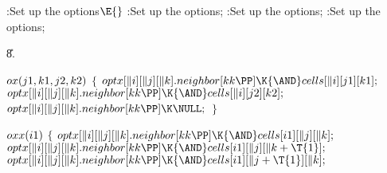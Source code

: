 \B{}:Set up the options\X${}\E{}$\6
:Set up the  options\X;\6
:Set up the  options\X;\6
:Set up the  options\X;\par
\U8.\fi

\B\D$\\{ox}(\\{j1},\\{k1},\\{j2},\\{k2})$ \6
${}\{{}$\1\6
${}\\{optx}[\|i][\|j][\|k].\\{neighbor}[\\{kk}\PP]\K{\AND}\\{cells}[\|i][%
\\{j1}][\\{k1}];{}$\6
${}\\{optx}[\|i][\|j][\|k].\\{neighbor}[\\{kk}\PP]\K{\AND}\\{cells}[\|i][%
\\{j2}][\\{k2}];{}$\6
${}\\{optx}[\|i][\|j][\|k].\\{neighbor}[\\{kk}\PP]\K\NULL;{}$\6
\4${}\}{}$\2\par
\B\4\D$\\{oxx}(\\{i1})$ \6
${}\{{}$\1\6
${}\\{optx}[\|i][\|j][\|k].\\{neighbor}[\\{kk}\PP]\K{\AND}\\{cells}[\\{i1}][%
\|j][\|k];{}$\6
${}\\{optx}[\|i][\|j][\|k].\\{neighbor}[\\{kk}\PP]\K{\AND}\\{cells}[\\{i1}][%
\|j][\|k+\T{1}];{}$\6
${}\\{optx}[\|i][\|j][\|k].\\{neighbor}[\\{kk}\PP]\K{\AND}\\{cells}[\\{i1}][%
\|j+\T{1}][\|k];{}$\6

